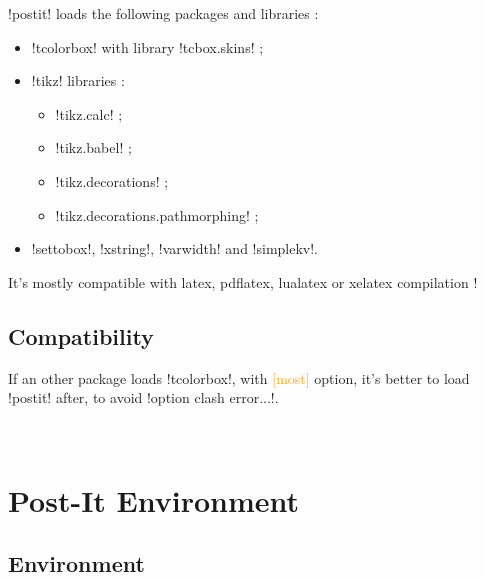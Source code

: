 \documentclass[english,a4paper,11pt]{article}
\newcommand\Cle[1]{{\small\sffamily\textlangle \textcolor{orange}{#1}\textrangle}}
\begin{document}
\begin{noteblock}
\packagetex!postit! loads the following packages and libraries :

\begin{itemize}
	\item \packagetex!tcolorbox! with library \packagetex!tcbox.skins! ;
	\item \packagetex!tikz! libraries :
	\begin{itemize}
		\item \packagetex!tikz.calc! ;
		\item \packagetex!tikz.babel! ;
		\item \packagetex!tikz.decorations! ;
		\item \packagetex!tikz.decorations.pathmorphing! ;
	\end{itemize}
	\item \packagetex!settobox!, \packagetex!xstring!, \packagetex!varwidth! and \packagetex!simplekv!.
\end{itemize}

It’s mostly compatible with \textsf{latex}, \textsf{pdflatex}, \textsf{lualatex} or \textsf{xelatex} compilation !
\end{noteblock}

\subsection{Compatibility}

\begin{cautionblock}
If an other package loads \packagetex!tcolorbox!, with \Cle{[most]} option, it's better to load \packagetex!postit! after, to avoid \motcletex!option clash error...!.
\end{cautionblock}


\vfill~

\pagebreak

\section{Post-It Environment}

\subsection{Environment}
\end{document}
